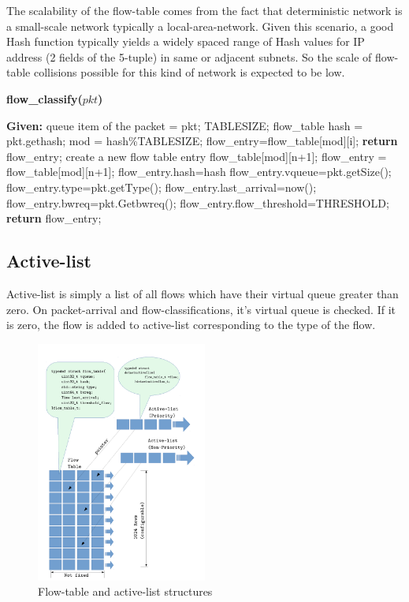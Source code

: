\documentclass[conference]{IEEEtran}
\begin{document}
The scalability of the flow-table comes from the fact that deterministic network is a small-scale network typically a local-area-network. Given this scenario, a good Hash function typically yields a widely spaced range of Hash values for IP address (2 fields of the 5-tuple) in same or adjacent subnets. So the scale of flow-table collisions possible for this kind of network is expected to be low.

\begin{algorithm}
\caption{\textbf{flow\_classify($pkt$)}}
\label {algo:flowclassification}
\begin{algorithmic}[1]
\STATE \textbf{Given:} queue item of the packet = pkt; TABLESIZE; flow\_table
\STATE hash = pkt.gethash;
\STATE mod = hash\%TABLESIZE;
\STATE flow\_entry=flow\_table[mod][i];
\STATE \textbf{return} flow\_entry;
\ENDIF
\ENDFOR
\STATE create a new flow table entry flow\_table[mod][n+1];
\STATE flow\_entry = flow\_table[mod][n+1];
\STATE flow\_entry.hash=hash
\STATE flow\_entry.vqueue=pkt.getSize();
\STATE flow\_entry.type=pkt.getType();
\STATE flow\_entry.last\_arrival=now();
\STATE flow\_entry.bwreq=pkt.Getbwreq();
\STATE flow\_entry.flow\_threshold=THRESHOLD;
\STATE \textbf{return} flow\_entry;
\end{algorithmic}
\end{algorithm}

\subsection{Active-list}
Active-list is simply a list of all flows which have their virtual queue greater than zero. On packet-arrival and flow-classifications, it's virtual queue is checked. If it is zero, the flow is added to active-list corresponding to the type of the flow.


\begin{figure}[ht]
	\begin{center}
		\includegraphics[width=0.50\textwidth]{figures/flowtable.pdf}
		\caption{Flow-table and active-list structures}\label{fig:flowtable}
	\end{center}
\end{figure}
\end{document}
